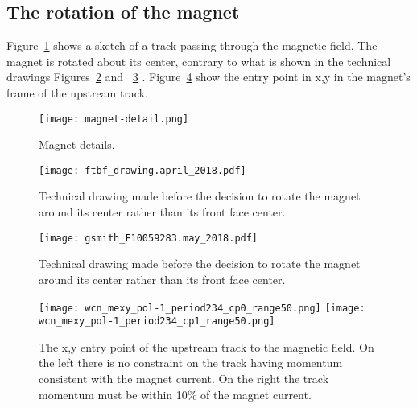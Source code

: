   
  
\newpage

\subsection{The rotation of the magnet}

Figure~\ref{fig_magnet} shows a sketch of a track passing through the magnetic field. The magnet is rotated about its center, contrary to what is shown in the technical drawings Figures~\ref{fig_td1} and ~\ref{fig_td2} . Figure~\ref{fig_xymag} show the entry point in x,y in the magnet's frame of the upstream track. 

\begin{figure}[h]	   
 \centering
        	\texttt{[image: magnet-detail.png]}	 
   \caption[short]{Magnet details.}
   \label{fig_magnet}
  \end{figure}
  
  \begin{figure}[h]	   
 \centering
        	\texttt{[image: ftbf\_drawing.april\_2018.pdf]}	 
   \caption[short]{Technical drawing made before the decision to rotate the magnet around its center rather than its front face center.}
   \label{fig_td1}
  \end{figure}
  
    \begin{figure}[h]	   
 \centering
        	\texttt{[image: gsmith\_F10059283.may\_2018.pdf]}	 
   \caption[short]{Technical drawing made before the decision to rotate the magnet around its center rather than its front face center.}
   \label{fig_td2}
  \end{figure}
  
  

       \begin{figure}[h]	   
            \centering
%   
            \texttt{[image: wcn\_mexy\_pol-1\_period234\_cp0\_range50.png]}
             \texttt{[image: wcn\_mexy\_pol-1\_period234\_cp1\_range50.png]}
   \caption[short]{The x,y entry point of the upstream track to the magnetic field. On the left there is no constraint on the track having momentum consistent with the magnet current. On the right the track momentum must be within 10\% of the magnet current.}
   \label{fig_xymag}
  \end{figure}
  

  
  
  


 
